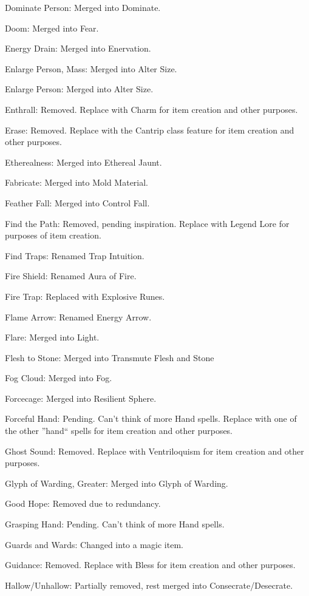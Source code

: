 {\begin{list}{}{\leftmargin=1em}
 \item Dominate Person: Merged into Dominate.
 \item Doom: Merged into Fear.
 \item Energy Drain: Merged into Enervation.
 \item Enlarge Person, Mass: Merged into Alter Size.
 \item Enlarge Person: Merged into Alter Size.
 \item Enthrall: Removed. Replace with Charm for item creation and other purposes.
 \item Erase: Removed. Replace with the Cantrip class feature for item creation and other purposes.
 \item Etherealness: Merged into Ethereal Jaunt.
 \item Fabricate: Merged into Mold Material.
 \item Feather Fall: Merged into Control Fall.
 \item Find the Path: Removed, pending inspiration. Replace with Legend Lore for purposes of item creation.
 \item Find Traps: Renamed Trap Intuition.
 \item Fire Shield: Renamed Aura of Fire.
 \item Fire Trap: Replaced with Explosive Runes.
 \item Flame Arrow: Renamed Energy Arrow.
 \item Flare: Merged into Light.
 \item Flesh to Stone: Merged into Transmute Flesh and Stone
 \item Fog Cloud: Merged into Fog.
 \item Forcecage: Merged into Resilient Sphere.
 \item Forceful Hand: Pending. Can't think of more Hand spells. Replace with one of the other ''hand`` spells for item creation and other purposes.
 \item Ghost Sound: Removed. Replace with Ventriloquism for item creation and other purposes.
 \item Glyph of Warding, Greater: Merged into Glyph of Warding.
 \item Good Hope: Removed due to redundancy.
 \item Grasping Hand: Pending. Can't think of more Hand spells.
 \item Guards and Wards: Changed into a magic item.
 \item Guidance: Removed. Replace with Bless for item creation and other purposes.
 \item Hallow/Unhallow: Partially removed, rest merged into Consecrate/Desecrate.

\end{list}}
